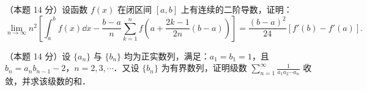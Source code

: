\begin{problems}
\item[五、]（本题 14 分）设函数 $f(x)$ 在闭区间 $[a,b]$ 上有连续的二阶导数，证明：
\[
\lim_{n\to\infty}n^{2}\left[\int_{a}^{b}f(x)\dd x-\frac{b-a}{n}\sum_{k=1}^{n}f\left(a+\frac{2k-1}{2n}(b-a)\right)\right]=\frac{(b-a)^{2}}{24}\left[f'(b)-f'(a)\right].
\]

\item[六、]（本题 14 分）设 $\{a_{n}\}$ 与 $\{b_{n}\}$ 均为正实数列，满足：$a_{1}=b_{1}=1$，且 $b_{n}=a_{n}b_{n-1}-2$，$n=2,3,\cdots$．又设 $\{b_{n}\}$ 为有界数列，证明级数 $\displaystyle\sum_{n=1}^{\infty}\frac{1}{a_{1}a_{2}\cdots a_{n}}$ 收敛，并求该级数的和．

\end{problems}
